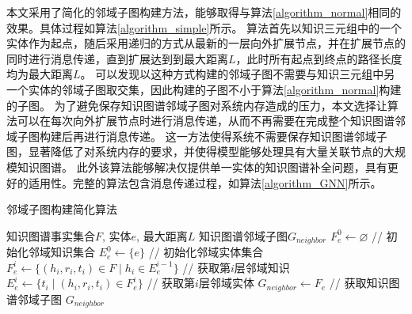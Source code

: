 \documentclass[algorithmlist, AutoFakeBold, AutoFakeSlant, figurelist, tablelist, nomlist, engineering]{seuthesix}
\begin{document}
本文采用了简化的邻域子图构建方法，能够取得与算法\ref{algorithm_normal}相同的效果。具体过程如算法\ref{algorithm_simple}所示。
算法首先以知识三元组中的一个实体作为起点，随后采用递归的方式从最新的一层向外扩展节点，并在扩展节点的同时进行消息传递，直到扩展达到到最大距离$L$，此时所有起点到终点的路径长度均为最大距离$L$。
可以发现以这种方式构建的邻域子图不需要与知识三元组中另一个实体的邻域子图取交集，因此构建的子图不小于算法\ref{algorithm_normal}构建的子图。
为了避免保存知识图谱邻域子图对系统内存造成的压力，本文选择让算法可以在每次向外扩展节点时进行消息传递，从而不再需要在完成整个知识图谱邻域子图构建后再进行消息传递。
这一方法使得系统不需要保存知识图谱邻域子图，显著降低了对系统内存的要求，并使得模型能够处理具有大量关联节点的大规模知识图谱。
此外该算法能够解决仅提供单一实体的知识图谱补全问题，具有更好的适用性。完整的算法包含消息传递过程，如算法\ref{algorithm_GNN}所示。
\begin{algorithm}[tb]
	\caption{邻域子图构建简化算法}
	\label{algorithm_simple}
	\begin{algorithmic}[1]
  \Require 知识图谱事实集合$F$, 实体$e$, 最大距离$L$
  \Ensure 知识图谱邻域子图$G_{neighbor}$
  \State $F_{e}^{0} \leftarrow \varnothing$ // 初始化邻域知识集合
  \State $E_{e}^{0} \leftarrow \{e\}$ // 初始化邻域实体集合
  \State $F_{e}^{i} \leftarrow \{(h_i, r_i, t_i) \in F \mid h_i \in E_{e}^{i-1}\}$ // 获取第$i$层邻域知识
  \State $E_{e}^{i} \leftarrow \{t_i \mid (h_i, r_i, t_i) \in F_{e}^{i}\}$ // 获取第$i$层邻域实体
  \EndFor
  \State $G_{neighbor} \leftarrow F_{e}$ // 获取知识图谱邻域子图
  \State \Return $G_{neighbor}$
	\end{algorithmic}
\end{algorithm} 
\end{document}
